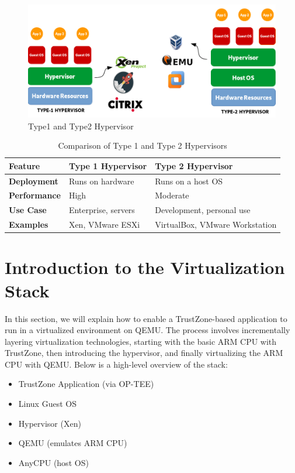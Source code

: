\documentclass[acmtog]{acmart}
\begin{document}
\begin{figure}[ht]
  \centering
  \includegraphics[width=\columnwidth]{images/hypervisor_type12.png}
  \caption{Type1 and Type2 Hypervisor}
  \label{fig:image_label}
\end{figure}

\begin{table}[h!]
\centering
\caption{Comparison of Type 1 and Type 2 Hypervisors}
\begin{tabular}{|l|l|l|}
\hline
\textbf{Feature}         & \textbf{Type 1 Hypervisor} & \textbf{Type 2 Hypervisor} \\ \hline
\textbf{Deployment}      & Runs on hardware          & Runs on a host OS          \\ \hline
\textbf{Performance}     & High                      & Moderate                   \\ \hline
\textbf{Use Case}        & Enterprise, servers       & Development, personal use  \\ \hline
\textbf{Examples}        & Xen, VMware ESXi          & VirtualBox, VMware Workstation \\ \hline
\end{tabular}
\end{table}


\section{Introduction to the Virtualization Stack}

In this section, we will explain how to enable a TrustZone-based application to run in a virtualized environment on QEMU. The process involves incrementally layering virtualization technologies, starting with the basic ARM CPU with TrustZone, then introducing the hypervisor, and finally virtualizing the ARM CPU with QEMU. Below is a high-level overview of the stack:

\begin{itemize}
    \item TrustZone Application (via OP-TEE)
    \item Linux Guest OS
    \item Hypervisor (Xen)
    \item QEMU (emulates ARM CPU)
    \item AnyCPU (host OS)
\end{itemize}
\end{document}
